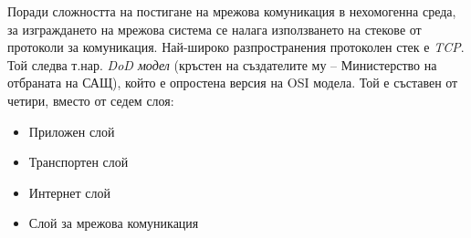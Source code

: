 \documentclass{scrartcl}
\begin{document}
Поради сложността на постигане на мрежова комуникация в нехомогенна среда, за
изграждането на мрежова система се налага използването на стекове от протоколи
за комуникация. Най-широко разпространения протоколен стек е \emph{TCP\IP}. Той
следва т.нар. \emph{DoD модел} (кръстен на създателите му – Министерство на
отбраната на САЩ), който е опростена версия на OSI модела. Той е съставен от
четири, вместо от седем слоя:
\begin{itemize}
\item Приложен слой
\item Транспортен слой
\item Интернет слой
\item Слой за мрежова комуникация
\end{itemize}
\end{document}
